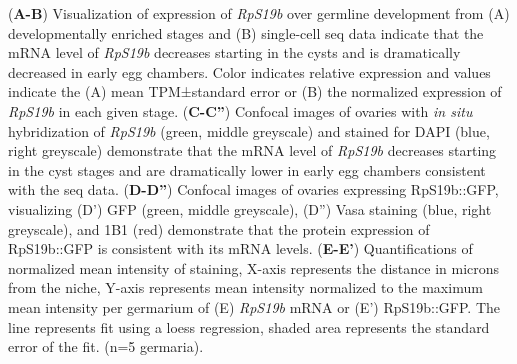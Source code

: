 \documentclass[12pt,oneside]{reedthesis}
\begin{document}
\setlength\parindent{0pt}(\textbf{A-B}) Visualization of expression of \emph{RpS19b} over germline development from (A) developmentally enriched stages and (B) single-cell seq data indicate that the mRNA level of \emph{RpS19b} decreases starting in the cysts and is dramatically decreased in early egg chambers. Color indicates relative expression and values indicate the (A) mean TPM±standard error or (B) the normalized expression of \emph{RpS19b} in each given stage. (\textbf{C-C''}) Confocal images of ovaries with \emph{in situ} hybridization of \emph{RpS19b} (green, middle greyscale) and stained for DAPI (blue, right greyscale) demonstrate that the mRNA level of \emph{RpS19b} decreases starting in the cyst stages and are dramatically lower in early egg chambers consistent with the seq data. (\textbf{D-D''}) Confocal images of ovaries expressing RpS19b::GFP, visualizing (D') GFP (green, middle greyscale), (D'') Vasa staining (blue, right greyscale), and 1B1 (red) demonstrate that the protein expression of RpS19b::GFP is consistent with its mRNA levels. (\textbf{E-E'}) Quantifications of normalized mean intensity of staining, X-axis represents the distance in microns from the niche, Y-axis represents mean intensity normalized to the maximum mean intensity per germarium of (E) \emph{RpS19b} mRNA or (E') RpS19b::GFP. The line represents fit using a loess regression, shaded area represents the standard error of the fit. (n=5 germaria).

\end{document}
